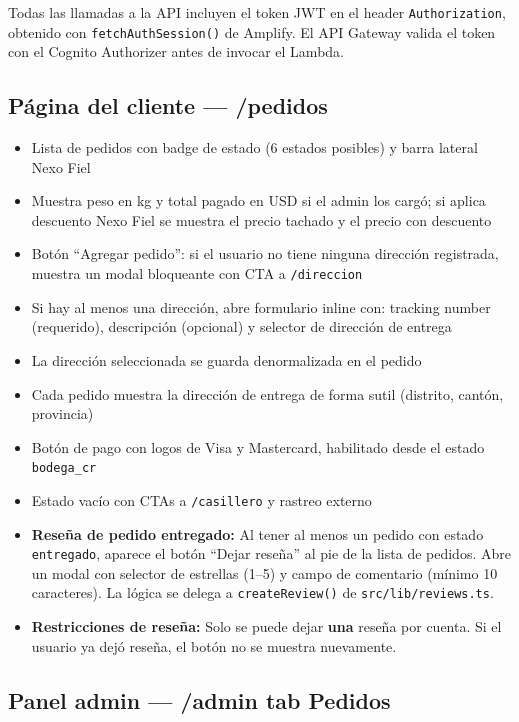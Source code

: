 \documentclass[12pt,a4paper]{article}
\begin{document}
\begin{nexobox}
Todas las llamadas a la API incluyen el token JWT en el header
\texttt{Authorization}, obtenido con \texttt{fetchAuthSession()} de Amplify.
El API Gateway valida el token con el Cognito Authorizer antes de invocar el Lambda.
\end{nexobox}

\subsection{Página del cliente --- /pedidos}

\begin{itemize}
  \item Lista de pedidos con badge de estado (6 estados posibles) y barra lateral Nexo Fiel
  \item Muestra peso en kg y total pagado en USD si el admin los cargó; si aplica descuento Nexo Fiel se muestra el precio tachado y el precio con descuento
  \item Botón ``Agregar pedido'': si el usuario no tiene ninguna dirección registrada, muestra un modal bloqueante con CTA a \texttt{/direccion}
  \item Si hay al menos una dirección, abre formulario inline con: tracking number (requerido), descripción (opcional) y selector de dirección de entrega
  \item La dirección seleccionada se guarda denormalizada en el pedido
  \item Cada pedido muestra la dirección de entrega de forma sutil (distrito, cantón, provincia)
  \item Botón de pago con logos de Visa y Mastercard, habilitado desde el estado \texttt{bodega\_cr}
  \item Estado vacío con CTAs a \texttt{/casillero} y rastreo externo
  \item \textbf{Reseña de pedido entregado:} Al tener al menos un pedido con estado
    \texttt{entregado}, aparece el botón ``Dejar reseña'' al pie de la lista de pedidos.
    Abre un modal con selector de estrellas (1--5) y campo de comentario (mínimo 10
    caracteres). La lógica se delega a \texttt{createReview()} de
    \texttt{src/lib/reviews.ts}.
  \item \textbf{Restricciones de reseña:} Solo se puede dejar \textbf{una} reseña por
    cuenta. Si el usuario ya dejó reseña, el botón no se muestra nuevamente.
\end{itemize}

\subsection{Panel admin --- /admin tab Pedidos}
\end{document}
